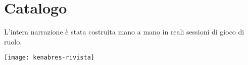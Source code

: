 {}
\chapter*{Catalogo}
\begingroup 
    \let\clearpage\relax
    \let\cleardoublepage\relax
    \let\cleardoublepage\relax
\pagestyle{scrheadings} 

L'intera narrazione \`e stata costruita mano a mano in reali sessioni di gioco di ruolo.

\vspace{2cm}

\texttt{[image: kenabres-rivista]}

\endgroup 